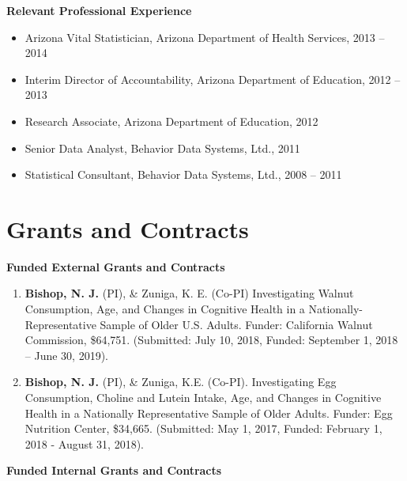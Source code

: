 \documentclass[
]{article}
\begin{document}
\textbf{Relevant Professional Experience}

\begin{itemize}
\item
  Arizona Vital Statistician, Arizona Department of Health Services,
  2013 -- 2014
\item
  Interim Director of Accountability, Arizona Department of Education,
  2012 -- 2013
\item
  Research Associate, Arizona Department of Education, 2012
\item
  Senior Data Analyst, Behavior Data Systems, Ltd., 2011
\item
  Statistical Consultant, Behavior Data Systems, Ltd., 2008 -- 2011
\end{itemize}

\hypertarget{grants-and-contracts}{%
\section{\texorpdfstring{\textbf{Grants and
Contracts}}{Grants and Contracts}}\label{grants-and-contracts}}

\textbf{Funded External Grants and Contracts}

\begin{enumerate}
\def\labelenumi{\arabic{enumi}.}
\item
  \textbf{Bishop, N. J.} (PI), \& Zuniga, K. E. (Co-PI) Investigating
  Walnut Consumption, Age, and Changes in Cognitive Health in a
  Nationally-Representative Sample of Older U.S. Adults. Funder:
  California Walnut Commission, \$64,751. (Submitted: July 10, 2018,
  Funded: September 1, 2018 -- June 30, 2019).
\item
  \textbf{Bishop, N. J.} (PI), \& Zuniga, K.E. (Co-PI). Investigating
  Egg Consumption, Choline and Lutein Intake, Age, and Changes in
  Cognitive Health in a Nationally Representative Sample of Older
  Adults. Funder: Egg Nutrition Center, \$34,665. (Submitted: May 1,
  2017, Funded: February 1, 2018 - August 31, 2018).
\end{enumerate}

\textbf{Funded Internal Grants and Contracts}
\end{document}
